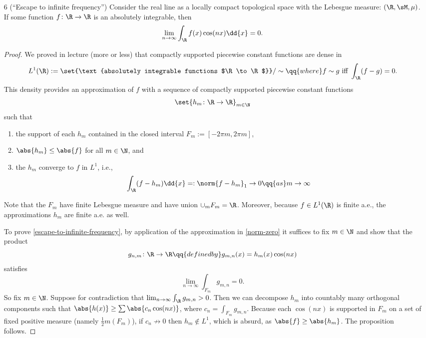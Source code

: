 \documentclass[onesided]{ccg-pset}
\author{Colton Grainger}
\date{\today}
\begin{document}
\maketitle

\begin{enumerate}
\item[6] (``Escape to infinite frequency'') Consider the real line as a locally compact topological space with the Lebesgue measure: $(\R, \sM, \mu)$. If some function $f \colon \R \to \R$ is an absolutely integrable, then 
\begin{equation}
    \label{escape-to-infinite-frequency}
    \lim_{n\to\infty} \int_\R f(x)\cos(nx)\dd{x} = 0.
\end{equation}

\begin{proof}
We proved in lecture (more or less) that compactly supported piecewise constant functions are dense in 
\[L^1(\R):=\set{\text{absolutely integrable functions $\R \to \R$}}/\sim \qq{where} f \sim g \text{ iff } \int_\R(f-g) = 0.\] 
This density provides an approximation of $f$ with a sequence of compactly supported piecewise constant functions
\[
\set{h_m \colon \R \to \R}_{m  \in \N}
\]
such that 

\begin{enumerate}
\item the support of each $h_m$ contained in the closed interval $F_m :=[-2\pi m,2\pi m]$,
\item $\abs{h_m} \le \abs{f}$ for all $m \in \N$, and
\item the $h_m$ converge to $f$ in $L^1$, i.e.,
\begin{equation}
    \label{norm-zero}
    \int_\R (f - h_m) \dd{x} =: \norm{f - h_m}_1 \to 0 \qq{as} m \to \infty
\end{equation}
\end{enumerate}

Note that the $F_m$ have finite Lebesgue measure and have union $\cup_m F_m = \R$. Moreover, because $f \in L^1(\R)$ is finite a.e., the approximations $h_m$ are finite a.e. as well. 

To prove \eqref{escape-to-infinite-frequency}, by application of the approximation in \eqref{norm-zero} it suffices to fix $m \in \N$ and show that the product \[g_{n,m} \colon \R \to \R \qq{defined by} g_{m,n}(x) = h_m(x)\cos(nx)\] satisfies
\[
    \lim_{n\to\infty} \int_{F_m} g_{m,n} = 0.
\]
So fix $m \in \N$. Suppose for contradiction that $\lim_{n\to\infty} \int_\R g_{m,n} > 0$. Then we can decompose $h_m$ into countably many orthogonal components such that $\abs{h(x)} \ge \sum \abs{c_n \cos(nx)}$, where $c_n = \int_{F_m} g_{m,n}$. Because each $\cos(nx)$ is supported in $F_m$ on a set of fixed positive measure (namely $\frac{1}{2}m(F_m)$), if $c_n \not\to 0$ then $h_m \not\in L^1$, which is absurd, as $\abs{f} \ge \abs{h_m}$. The proposition follows.
\end{proof}

\end{enumerate}
\end{document}
